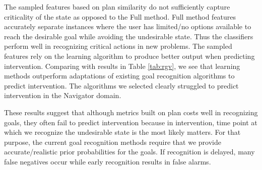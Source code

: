 \documentclass[letterpaper]{article}
\theoremstyle{plain}
\begin{document}
The sampled features based on plan similarity do not sufficiently capture criticality of the state as opposed to  the Full method. Full method features accurately separate instances where the user has limited/no options available to reach the desirable goal while avoiding the undesirable state. Thus the classifiers perform well in recognizing critical actions in new problems. The sampled features rely on the learning algorithm to produce better output when predicting intervention. 
Comparing with results in Table \ref{tab:rgv}, we see that learning methods outperform adaptations of existing goal recognition algorithms to predict intervention. The algorithms we selected clearly struggled to predict intervention in the Navigator domain. 

These results suggest that although metrics built on plan costs well in recognizing goals, they often fail to predict intervention because in intervention, time point at which we recognize the undesirable state is the most likely matters. For that purpose, the current goal recognition methods require that we provide accurate/realistic prior probabilities for the goals. If recognition is delayed, many false negatives occur while early recognition results in false alarms.

\end{document}
